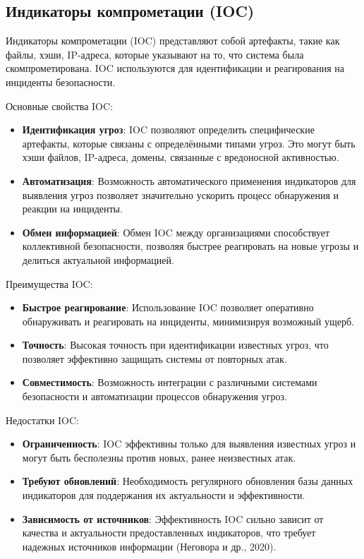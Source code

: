 \subsection{Индикаторы компрометации (IOC)}

Индикаторы компрометации (IOC) представляют собой артефакты, такие как файлы, хэши, IP-адреса, которые указывают на то, что система была скомпрометирована. IOC используются для идентификации и реагирования на инциденты безопасности.

Основные свойства IOC:
\begin{itemize}
    \item \textbf{Идентификация угроз}: IOC позволяют определить специфические артефакты, которые связаны с определёнными типами угроз. Это могут быть хэши файлов, IP-адреса, домены, связанные с вредоносной активностью.
    \item \textbf{Автоматизация}: Возможность автоматического применения индикаторов для выявления угроз позволяет значительно ускорить процесс обнаружения и реакции на инциденты.
    \item \textbf{Обмен информацией}: Обмен IOC между организациями способствует коллективной безопасности, позволяя быстрее реагировать на новые угрозы и делиться актуальной информацией.
\end{itemize}

Преимущества IOC:
\begin{itemize}
    \item \textbf{Быстрое реагирование}: Использование IOC позволяет оперативно обнаруживать и реагировать на инциденты, минимизируя возможный ущерб.
    \item \textbf{Точность}: Высокая точность при идентификации известных угроз, что позволяет эффективно защищать системы от повторных атак.
    \item \textbf{Совместимость}: Возможность интеграции с различными системами безопасности и автоматизации процессов обнаружения угроз.
\end{itemize}

Недостатки IOC:
\begin{itemize}
    \item \textbf{Ограниченность}: IOC эффективны только для выявления известных угроз и могут быть бесполезны против новых, ранее неизвестных атак.
    \item \textbf{Требуют обновлений}: Необходимость регулярного обновления базы данных индикаторов для поддержания их актуальности и эффективности.
    \item \textbf{Зависимость от источников}: Эффективность IOC сильно зависит от качества и актуальности предоставленных индикаторов, что требует надежных источников информации (Неговора и др., 2020).
\end{itemize}

